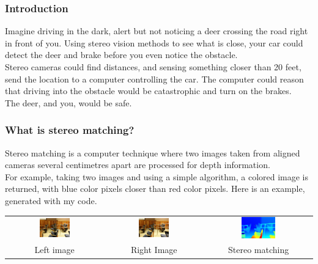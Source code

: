 \documentclass[19pt]{beamer}
\begin{document}

\begin{frame}
\frametitle{Introduction}

Imagine driving in the dark, alert but not noticing a deer crossing the road right in front of you. Using stereo vision methods to see what is close, your car could detect the deer and brake before you even notice the obstacle. \\[15pt]
%
Stereo cameras could find distances, and sensing something closer than 20 feet, send the location to a computer controlling the car. The computer could reason that driving into the obstacle would be catastrophic and turn on the brakes. \\[15pt]
%
The deer, and you, would be safe.
\end{frame}


\begin{frame}
\frametitle{What is stereo matching?}

Stereo matching is a computer technique where two images taken from aligned cameras several centimetres apart are processed for depth information. \\[15pt]
%
For example, taking two images and using a simple algorithm, a colored image is returned, with blue color pixels closer than red color pixels. Here is an example, generated with my code.\\[20pt]

\centering
\setlength{}
\begin{tabular}{ccc}
\includegraphics[width=0.33\textwidth]{images/im0-600.jpg} &
\includegraphics[width=0.33\textwidth]{images/im1-600.jpg} &
\includegraphics[width=0.33\textwidth]{images/disp-600.jpg} \\[2pt]
Left image & Right Image & Stereo matching \\
\end{tabular}

\end{frame}
\end{document}
